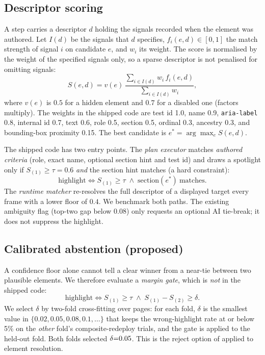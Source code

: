 \documentclass[conference]{IEEEtran}
\begin{document}
\subsection{Descriptor scoring}
A step carries a descriptor $d$ holding the signals recorded when the element was authored. Let $I(d)$ be the signals that $d$ specifies, $f_i(e,d)\in[0,1]$ the match strength of signal $i$ on candidate $e$, and $w_i$ its weight. The score is normalised by the weight of the specified signals only, so a sparse descriptor is not penalised for omitting signals:
\begin{equation}
S(e,d)=v(e)\,\frac{\sum_{i\in I(d)} w_i\, f_i(e,d)}{\sum_{i\in I(d)} w_i},
\label{eq:score}
\end{equation}
where $v(e)$ is $0.5$ for a hidden element and $0.7$ for a disabled one (factors multiply). The weights in the shipped code are test id 1.0, name 0.9, \texttt{aria-label} 0.8, internal id 0.7, text 0.6, role 0.5, section 0.5, ordinal 0.3, ancestry 0.3, and bounding-box proximity 0.15. The best candidate is $e^{*}=\arg\max_e S(e,d)$.

The shipped code has two entry points. The \emph{plan executor} matches \emph{authored criteria} (role, exact name, optional section hint and test id) and draws a spotlight only if $S_{(1)}\ge\tau=0.6$ \emph{and} the section hint matches (a hard constraint):
\begin{equation}
\text{highlight} \iff S_{(1)}\ge\tau \;\wedge\; \text{section}(e^{*})\ \text{matches}.
\label{eq:gate}
\end{equation}
The \emph{runtime matcher} re-resolves the full descriptor of a displayed target every frame with a lower floor of $0.4$. We benchmark both paths. The existing ambiguity flag (top-two gap below $0.08$) only requests an optional AI tie-break; it does not suppress the highlight.

\subsection{Calibrated abstention (proposed)}
A confidence floor alone cannot tell a clear winner from a near-tie between two plausible elements. We therefore evaluate a \emph{margin gate}, which is \emph{not} in the shipped code:
\begin{equation}
\text{highlight} \iff S_{(1)}\ge\tau \;\wedge\; S_{(1)}-S_{(2)}\ge\delta.
\label{eq:margin}
\end{equation}
We select $\delta$ by two-fold cross-fitting over pages: for each fold, $\delta$ is the smallest value in $\{0.02,0.05,0.08,0.1,\dots\}$ that keeps the wrong-highlight rate at or below 5\% on the \emph{other} fold's composite-redeploy trials, and the gate is applied to the held-out fold. Both folds selected $\delta{=}0.05$. This is the reject option of \cite{chow1970} applied to element resolution.
\end{document}
